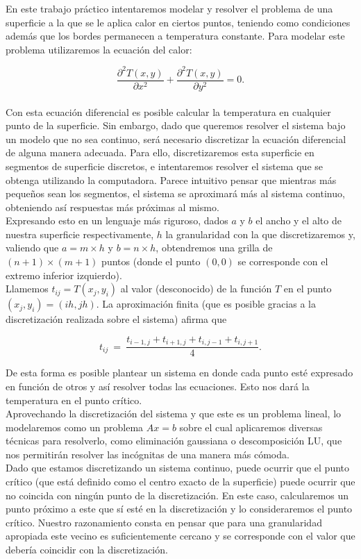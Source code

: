 En este trabajo práctico intentaremos modelar y resolver el problema de una superficie a la que se le aplica calor en ciertos puntos, teniendo como condiciones además que los bordes permanecen a temperatura constante. Para modelar este problema utilizaremos la ecuación del calor:

\begin{equation}
\frac{\partial^2T(x,y)}{\partial x^{2}}+\frac{\partial^2 T(x,y)}{\partial y^{2}} = 0.
\end{equation}\\

Con esta ecuación diferencial es posible calcular la temperatura en cualquier punto de la superficie. Sin embargo, dado que queremos resolver el sistema bajo un modelo que no sea continuo, será necesario discretizar la ecuación diferencial de alguna manera adecuada. Para ello, discretizaremos esta superficie en segmentos de superficie discretos, e intentaremos resolver el sistema que se obtenga utilizando la computadora. Parece intuitivo pensar que mientras más pequeños sean los segmentos, el sistema se aproximará más al sistema continuo, obteniendo así respuestas más próximas al mismo.
\\
Expresando esto en un lenguaje más riguroso, dados $a$ y $b$ el ancho y el alto de nuestra superficie respectivamente, $h$ la granularidad con la que discretizaremos y, valiendo que  $a = m\times h$ y $b = n \times h$, obtendremos una grilla de $(n+1)\times(m+1)$ puntos (donde el punto $(0,0)$ se corresponde con el extremo inferior izquierdo).
\\
Llamemos $t_{ij} = T(x_j,y_i)$ al valor (desconocido) de la función $T$ en el punto $(x_j, y_i) = (ih, jh)$. La aproximación finita (que es posible gracias a la discretización realizada sobre el sistema) afirma que

\begin{equation}
t_{ij} \ =\ \frac{ t_{i-1,j} + t_{i+1,j} + t_{i,j-1} + t_{i,j+1}}{4}.
\end{equation}

De esta forma es posible plantear un sistema en donde cada punto esté expresado en función de otros y así resolver todas las ecuaciones. Esto nos dará la temperatura en el punto crítico.
\\
Aprovechando la discretización del sistema y que este es un problema lineal, lo modelaremos como un problema $Ax=b$ sobre el cual aplicaremos diversas técnicas para resolverlo, como eliminación gaussiana o descomposición LU, que nos permitirán resolver las incógnitas de una manera más cómoda.
\\
Dado que estamos discretizando un sistema continuo, puede ocurrir que el punto crítico (que está definido como el centro exacto de la superficie) puede ocurrir que no coincida con ningún punto de la discretización. En este caso, calcularemos un punto próximo a este que sí esté en la discretización y lo consideraremos el punto crítico. Nuestro razonamiento consta en pensar que para una granularidad apropiada este vecino es suficientemente cercano y se corresponde con el valor que debería coincidir con la discretización.


